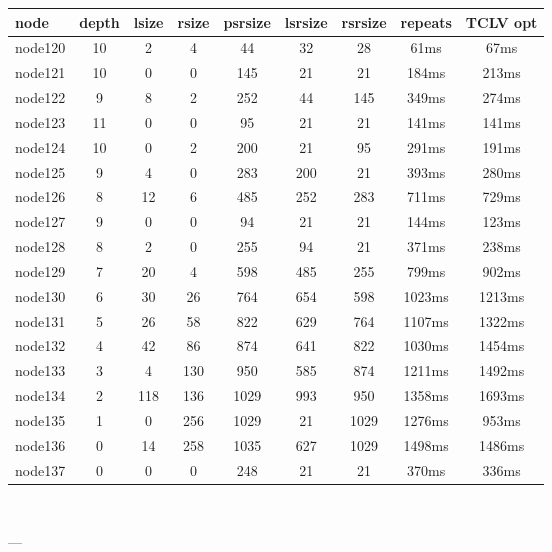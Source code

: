 \begin{tabular}{|l|c|c|c|c|c|c|c|c|}
\hline node & depth & lsize & rsize & psrsize & lsrsize & rsrsize   & repeats & TCLV opt\\
    \hline node120 & 10 & 2 & 4 & 44 & 32 & 28 & 61ms & 67ms\\
    \hline node121 & 10 & 0 & 0 & 145 & 21 & 21 & 184ms & 213ms\\
    \hline node122 & 9 & 8 & 2 & 252 & 44 & 145 & 349ms & 274ms\\
    \hline node123 & 11 & 0 & 0 & 95 & 21 & 21 & 141ms & 141ms\\
    \hline node124 & 10 & 0 & 2 & 200 & 21 & 95 & 291ms & 191ms\\
    \hline node125 & 9 & 4 & 0 & 283 & 200 & 21 & 393ms & 280ms\\
    \hline node126 & 8 & 12 & 6 & 485 & 252 & 283 & 711ms & 729ms\\
    \hline node127 & 9 & 0 & 0 & 94 & 21 & 21 & 144ms & 123ms\\
    \hline node128 & 8 & 2 & 0 & 255 & 94 & 21 & 371ms & 238ms\\
    \hline node129 & 7 & 20 & 4 & 598 & 485 & 255 & 799ms & 902ms\\
    \hline node130 & 6 & 30 & 26 & 764 & 654 & 598 & 1023ms & 1213ms\\
    \hline node131 & 5 & 26 & 58 & 822 & 629 & 764 & 1107ms & 1322ms\\
    \hline node132 & 4 & 42 & 86 & 874 & 641 & 822 & 1030ms & 1454ms\\
    \hline node133 & 3 & 4 & 130 & 950 & 585 & 874 & 1211ms & 1492ms\\
    \hline node134 & 2 & 118 & 136 & 1029 & 993 & 950 & 1358ms & 1693ms\\
    \hline node135 & 1 & 0 & 256 & 1029 & 21 & 1029 & 1276ms & 953ms\\
    \hline node136 & 0 & 14 & 258 & 1035 & 627 & 1029 & 1498ms & 1486ms\\
    \hline node137 & 0 & 0 & 0 & 248 & 21 & 21 & 370ms & 336ms\\

\hline
\end{tabular} \

---

